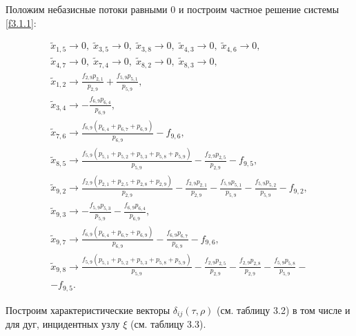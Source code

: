 \documentclass[14pt]{extarticle}%
\begin{document}
Положим небазисные потоки равными 0 и построим частное решение системы \eqref{f3.1.1}:

\begin{equation}
\begin{gathered}
\tilde{x}_{1,5}\to 0,\;
\tilde{x}_{3,5}\to 0,\;
\tilde{x}_{3,8}\to 0,\;
\tilde{x}_{4,3}\to 0,\;
\tilde{x}_{4,6}\to 0,\\
\tilde{x}_{4,7}\to 0,\;
\tilde{x}_{7,4}\to 0,\;
\tilde{x}_{8,2}\to 0,\;
\tilde{x}_{8,3}\to 0,\\
\tilde{x}_{1,2}\to \frac{f_{2,9} p_{2,1}}{p_{2,9}}+\frac{f_{5,9} p_{5,1}}{p_{5,9}},\\
\tilde{x}_{3,4}\to -\frac{f_{6,9} p_{6,4}}{p_{6,9}},\\
\tilde{x}_{7,6}\to \frac{f_{6,9} \left(p_{6,4}+p_{6,7}+p_{6,9}\right)}{p_{6,9}}-f_{9,6},\\
\tilde{x}_{8,5}\to \frac{f_{5,9} \left(p_{5,1}+p_{5,2}+p_{5,3}+p_{5,8}+p_{5,9}\right)}{p_{5,9}}-\frac{f_{2,9} p_{2,5}}{p_{2,9}}-f_{9,5},\\
\tilde{x}_{9,2}\to \frac{f_{2,9} \left(p_{2,1}+p_{2,5}+p_{2,8}+p_{2,9}\right)}{p_{2,9}}-\frac{f_{2,9} p_{2,1}}{p_{2,9}}-\frac{f_{5,9} p_{5,1}}{p_{5,9}}-\frac{f_{5,9} p_{5,2}}{p_{5,9}}-f_{9,2},\\
\tilde{x}_{9,3}\to -\frac{f_{5,9} p_{5,3}}{p_{5,9}}-\frac{f_{6,9} p_{6,4}}{p_{6,9}},\\
\tilde{x}_{9,7}\to \frac{f_{6,9} \left(p_{6,4}+p_{6,7}+p_{6,9}\right)}{p_{6,9}}-\frac{f_{6,9} p_{6,7}}{p_{6,9}}-f_{9,6},\\
\tilde{x}_{9,8}\to \frac{f_{5,9} \left(p_{5,1}+p_{5,2}+p_{5,3}+p_{5,8}+p_{5,9}\right)}{p_{5,9}}-\frac{f_{2,9} p_{2,5}}{p_{2,9}}-\frac{f_{2,9} p_{2,8}}{p_{2,9}}-\frac{f_{5,9} p_{5,8}}{p_{5,9}}-\\-f_{9,5}.
\end{gathered}
\end{equation}



Построим характеристические векторы $\delta_{ij}(\tau,\rho)$ (см. таблицу 3.2) в том числе и для дуг, инцидентных узлу $\xi$ (см. таблицу 3.3).
\end{document}

